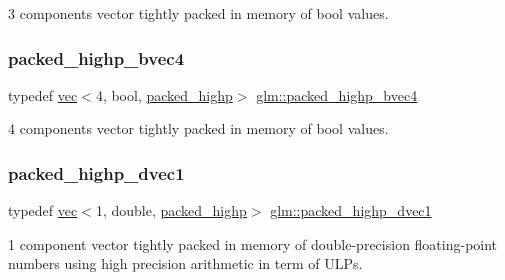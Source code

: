 3 components vector tightly packed in memory of bool values. 

\mbox{\label{group__gtc__type__aligned_gaa7a006e26052e668a16bf3b8bd81cbef}} 
\subsubsection{\texorpdfstring{packed\+\_\+highp\+\_\+bvec4}{packed\_highp\_bvec4}}
{\footnotesize\ttfamily typedef \mbox{\hyperlink{structglm_1_1vec}{vec}}$<$4, bool, \mbox{\hyperlink{namespaceglm_a36ed105b07c7746804d7fdc7cc90ff25a8e8791ee77fe079b1291f710d88031bf}{packed\+\_\+highp}}$>$ \mbox{\hyperlink{group__gtc__type__aligned_gaa7a006e26052e668a16bf3b8bd81cbef}{glm\+::packed\+\_\+highp\+\_\+bvec4}}}



4 components vector tightly packed in memory of bool values. 

\mbox{\label{group__gtc__type__aligned_ga28333ae58dc1ce6fdf75a8dba0065603}} 
\subsubsection{\texorpdfstring{packed\+\_\+highp\+\_\+dvec1}{packed\_highp\_dvec1}}
{\footnotesize\ttfamily typedef \mbox{\hyperlink{structglm_1_1vec}{vec}}$<$1, double, \mbox{\hyperlink{namespaceglm_a36ed105b07c7746804d7fdc7cc90ff25a8e8791ee77fe079b1291f710d88031bf}{packed\+\_\+highp}}$>$ \mbox{\hyperlink{group__gtc__type__aligned_ga28333ae58dc1ce6fdf75a8dba0065603}{glm\+::packed\+\_\+highp\+\_\+dvec1}}}



1 component vector tightly packed in memory of double-\/precision floating-\/point numbers using high precision arithmetic in term of U\+L\+Ps. 

